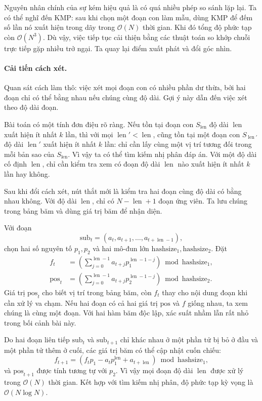\documentclass[11pt]{article}
\newcommand{\Oh}{\mathcal{O}}
\newcommand{\len}{\operatorname{len}}
\begin{document}
Nguyên nhân chính của sự kém hiệu quả là có quá nhiều phép so sánh lặp lại.
Ta có thể nghĩ đến KMP: sau khi chọn một đoạn con làm mẫu, dùng KMP để đếm số
lần nó xuất hiện trong dãy trong \(\Oh(N)\) thời gian. Khi đó tổng độ phức tạp
còn \(\Oh(N^3)\). Dù vậy, việc tiếp tục cải thiện bằng các thuật toán so khớp
chuỗi trực tiếp gặp nhiều trở ngại. Ta quay lại điểm xuất phát và đổi góc nhìn.

\paragraph{Cải tiến cách xét.}
Quan sát cách làm thô: việc xét mọi đoạn con có nhiều phần dư thừa, bởi hai
đoạn chỉ có thể bằng nhau nếu chúng cùng độ dài. Gợi ý này dẫn đến việc xét
theo độ dài đoạn.

Bài toán có một tính đơn điệu rõ ràng. Nếu tồn tại đoạn con \(S_{\len}\) độ
dài \(\len\) xuất hiện ít nhất \(k\) lần, thì với mọi
\(\len'<\len\), cũng tồn tại một đoạn con \(S_{\len'}\) độ dài \(\len'\) xuất
hiện ít nhất \(k\) lần: chỉ cần lấy cùng một vị trí tương đối trong mỗi bản
sao của \(S_{\len}\). Vì vậy ta có thể tìm kiếm nhị phân đáp án. Với một độ
dài cố định \(\len\), chỉ cần kiểm tra xem có đoạn độ dài \(\len\) nào xuất
hiện ít nhất \(k\) lần hay không.

Sau khi đổi cách xét, nút thắt mới là kiểm tra hai đoạn cùng độ dài có bằng
nhau không. Với độ dài \(\len\), chỉ có \(N-\len+1\) đoạn ứng viên. Ta lưu
chúng trong bảng băm và dùng giá trị băm để nhận diện.

Với đoạn
\[
  \mathrm{sub}_t=(a_t,a_{t+1},\ldots,a_{t+\len-1}),
\]
chọn hai số nguyên tố \(p_1,p_2\) và hai mô-đun lớn
\(\mathrm{hashsize}_1,\mathrm{hashsize}_2\). Đặt
\[
\begin{aligned}
  f_t &=
  \left(\sum_{j=0}^{\len-1} a_{t+j}p_1^{\len-1-j}\right)
  \bmod \mathrm{hashsize}_1,\\
  \mathrm{pos}_t &=
  \left(\sum_{j=0}^{\len-1} a_{t+j}p_2^{\len-1-j}\right)
  \bmod \mathrm{hashsize}_2.
\end{aligned}
\]
Giá trị \(\mathrm{pos}_t\) cho biết vị trí trong bảng băm, còn \(f_t\) thay
cho nội dung đoạn khi cần xử lý va chạm. Nếu hai đoạn có cả hai giá trị
\(\mathrm{pos}\) và \(f\) giống nhau, ta xem chúng là cùng một đoạn. Với hai
hàm băm độc lập, xác suất nhầm lẫn rất nhỏ trong bối cảnh bài này.

Do hai đoạn liên tiếp \(\mathrm{sub}_t\) và \(\mathrm{sub}_{t+1}\) chỉ khác
nhau ở một phần tử bị bỏ ở đầu và một phần tử thêm ở cuối, các giá trị băm
có thể cập nhật cuốn chiếu:
\[
  f_{t+1}=(f_t p_1-a_t p_1^{\len}+a_{t+\len})
  \bmod \mathrm{hashsize}_1,
\]
và \(\mathrm{pos}_{t+1}\) được tính tương tự với \(p_2\). Vì vậy mọi đoạn độ
dài \(\len\) được xử lý trong \(\Oh(N)\) thời gian. Kết hợp với tìm kiếm nhị
phân, độ phức tạp kỳ vọng là \(\Oh(N\log N)\).
\end{document}
